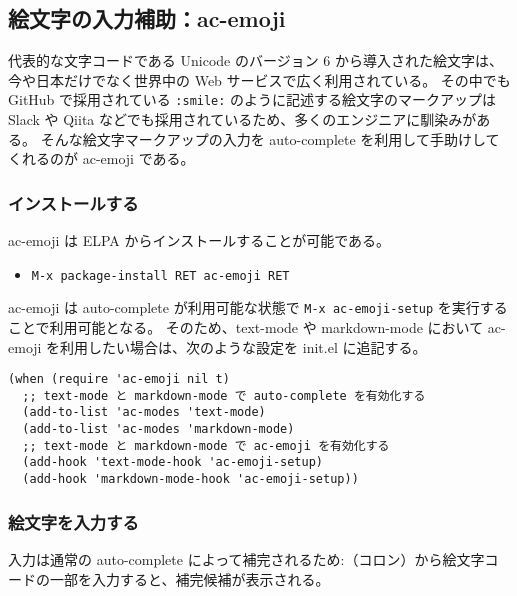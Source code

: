 \subsection{絵文字の入力補助：ac-emoji}
代表的な文字コードである Unicode のバージョン 6 から導入された絵文字は、今や日本だけでなく世界中の Web サービスで広く利用されている。
その中でも GitHub で採用されている \texttt{:smile:} のように記述する絵文字のマークアップは Slack や Qiita などでも採用されているため、多くのエンジニアに馴染みがある。
そんな絵文字マークアップの入力を auto-complete を利用して手助けしてくれるのが ac-emoji である。
\subsubsection{インストールする}
ac-emoji は ELPA からインストールすることが可能である。\enlargethispage{0.50zw}
\begin{itemize}\setlength{\leftskip}{-1.00zw}%
\item[] \texttt{M-x package-install RET ac-emoji RET}
\end{itemize}
ac-emoji は auto-complete が利用可能な状態で \texttt{M-x ac-emoji-setup} を実行することで利用可能となる。
そのため、text-mode や markdown-mode において ac-emoji を利用したい場合は、次のような設定を init.el に追記する。
\begin{mdframed}[roundcorner=0.50zw,leftmargin=3.00zw,rightmargin=3.00zw,skipabove=0.40zw,skipbelow=0.40zw,innertopmargin=4.00pt,innerbottommargin=4.00pt,innerleftmargin=5.00pt,innerrightmargin=5.00pt,linecolor=gray!020,linewidth=0.50pt,backgroundcolor=gray!20]
\begin{verbatim}
(when (require 'ac-emoji nil t)
  ;; text-mode と markdown-mode で auto-complete を有効化する
  (add-to-list 'ac-modes 'text-mode)
  (add-to-list 'ac-modes 'markdown-mode)
  ;; text-mode と markdown-mode で ac-emoji を有効化する
  (add-hook 'text-mode-hook 'ac-emoji-setup)
  (add-hook 'markdown-mode-hook 'ac-emoji-setup))
\end{verbatim}
\end{mdframed}
\subsubsection{絵文字を入力する}
入力は通常の auto-complete によって補完されるため\phantom{.}:（コロン）から絵文字コードの一部を入力すると、補完候補が表示される。
